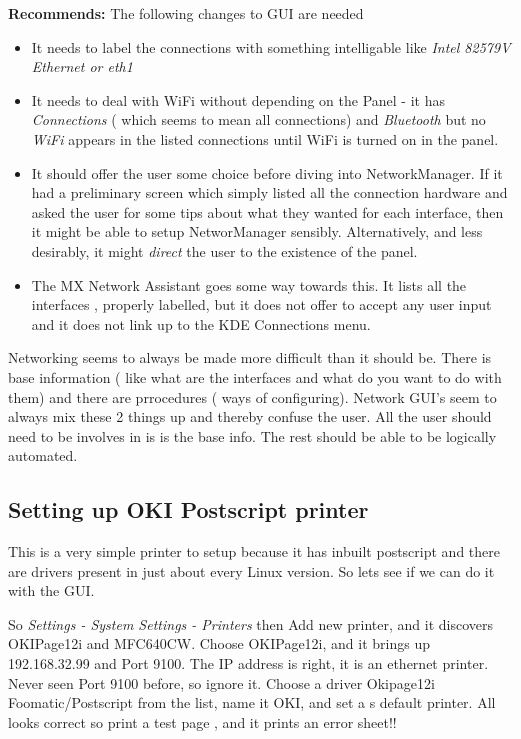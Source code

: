 \documentclass{article}  %
\begin{document}
{\bf Recommends:} The following changes to GUI are needed
\begin{itemize}
\item   It needs to label the connections with something intelligable like {\em Intel 82579V Ethernet or eth1}
\item It needs to deal with WiFi without depending on the Panel - it has {\em Connections} ( which seems to mean all connections) and {\em Bluetooth}  but no {\em WiFi}  appears in the listed connections until WiFi is turned on in the panel.
\item It should offer the user some choice before diving into NetworkManager. If it had a preliminary screen which simply listed all the connection hardware and asked the user for some tips about what they wanted for each interface, then it might be able to setup NetworManager sensibly. Alternatively, and less desirably, it might {\em direct} the user to the existence of the panel.
\item The MX Network Assistant goes some way towards this. It lists all the interfaces , properly labelled, but it does not offer to accept any user input and it does not link up to  the KDE Connections menu.
\end{itemize}
Networking seems to always be made more difficult than it should be. There is base information ( like what are the interfaces and what do you want to do with them) and there are prrocedures ( ways of configuring). Network GUI's seem to always mix these 2 things up and thereby confuse the user. All the user should need to be involves in is is the base info. The rest should be able to be logically automated.

\subsection{Setting up OKI Postscript printer}
This is a very simple printer to setup because it has inbuilt postscript and there are drivers present in just about every Linux version. So lets see if we can do it with the GUI.

So {\em Settings - System Settings - Printers} then
Add new printer, and it discovers OKIPage12i and MFC640CW. Choose OKIPage12i, and it brings up 192.168.32.99 and Port 9100. The IP address is right, it is an ethernet printer. Never seen Port 9100 before, so ignore it. Choose a driver Okipage12i Foomatic/Postscript from the list, name it OKI, and set a s default printer. All looks correct so print a test page , and it prints an error sheet!!
\end{document}
